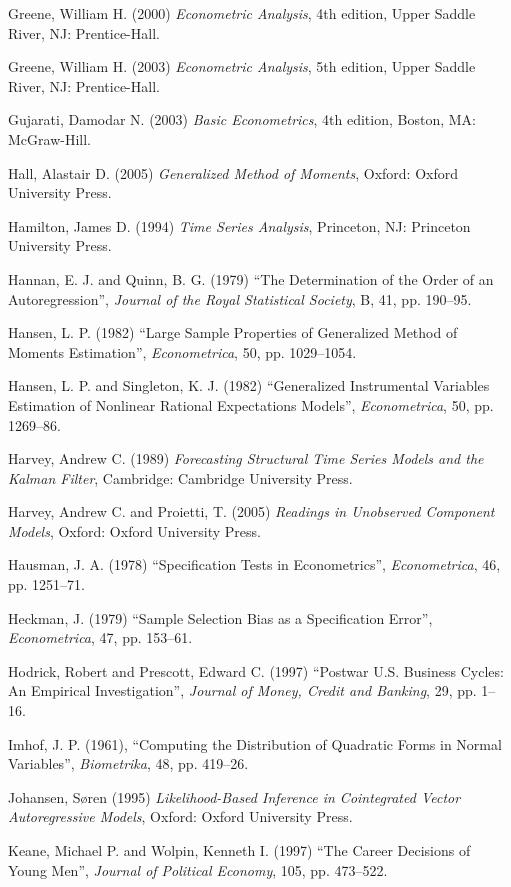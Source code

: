 \begin{thebibliography}
  Greene, William H. (2000) \emph{Econometric Analysis}, 4th edition,
  Upper Saddle River, NJ: Prentice-Hall.

  Greene, William H. (2003) \emph{Econometric Analysis}, 5th edition,
  Upper Saddle River, NJ: Prentice-Hall.

  Gujarati, Damodar N. (2003) \emph{Basic Econometrics}, 4th edition,
  Boston, MA: McGraw-Hill.

  Hall, Alastair D. (2005) \emph{Generalized Method of Moments},
  Oxford: Oxford University Press.

  Hamilton, James D. (1994) \emph{Time Series Analysis}, Princeton,
  NJ: Princeton University Press.

  Hannan, E. J. and Quinn, B. G. (1979) ``The Determination of the
    Order of an Autoregression'', \emph{Journal of the Royal
    Statistical Society}, B, 41, pp. 190--95.

  Hansen, L. P. (1982) ``Large Sample Properties of Generalized Method
  of Moments Estimation'', \emph{Econometrica}, 50, pp. 1029--1054.

  Hansen, L. P. and Singleton, K. J. (1982) ``Generalized
  Instrumental Variables Estimation of Nonlinear Rational Expectations
  Models'', \emph{Econometrica}, 50, pp. 1269--86. 

  Harvey, Andrew C. (1989) \emph{Forecasting Structural Time Series
    Models and the Kalman Filter}, Cambridge: Cambridge University
  Press.

  Harvey, Andrew C. and Proietti, T. (2005) \emph{Readings in
    Unobserved Component Models}, Oxford: Oxford University Press.

  Hausman, J. A. (1978) ``Specification Tests in Econometrics'',
  \emph{Econometrica}, 46, pp. 1251--71.

  Heckman, J. (1979) ``Sample Selection Bias as a Specification Error'',
  \emph{Econometrica}, 47, pp. 153--61.

  Hodrick, Robert and Prescott, Edward C. (1997) ``Postwar U.S. Business
  Cycles: An Empirical Investigation'', \emph{Journal of Money, Credit and
  Banking}, 29, pp. 1--16.

  Imhof, J. P. (1961), ``Computing the Distribution of Quadratic Forms
  in Normal Variables'', \emph{Biometrika}, 48, pp. 419--26.

  Johansen, S\o{}ren (1995) \emph{Likelihood-Based Inference in
    Cointegrated Vector Autoregressive Models}, Oxford: Oxford
  University Press.

  Keane, Michael P. and Wolpin, Kenneth I. (1997) ``The Career
  Decisions of Young Men'', \emph{Journal of Political Economy}, 105,
  pp. 473--522.


\end{thebibliography}
